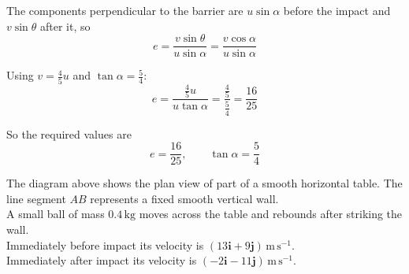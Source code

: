 \documentclass[leqno]{article}
\begin{document}
\begin{enumerate}[
  label=\textbf{\arabic*.},
  leftmargin=*,
  topsep=0pt,
  partopsep=0pt,
  parsep=0pt
]
\begin{djsSolution}
The components perpendicular to the barrier are \(u\sin\alpha\) before the impact and \(v\sin\theta\) after it, so
\[
e=\frac{v\sin\theta}{u\sin\alpha}
=\frac{v\cos\alpha}{u\sin\alpha}
\]

Using \(v=\frac45u\) and \(\tan\alpha=\frac54\):
\[
e=\frac{\frac45u}{u\tan\alpha}
=\frac{\frac45}{\frac54}
=\frac{16}{25}
\]

So the required values are
\[
e=\frac{16}{25},\qquad \tan\alpha=\frac54
\]
\end{djsSolution}


\newpage

\questionitem

\begin{figure}[H]
    \centering
{}
\end{figure}


The diagram above shows the plan view of part of a smooth horizontal table. The line segment $AB$ represents a fixed smooth vertical wall. \\

A small ball of mass $0.4\,\mathrm{kg}$ moves across the table and rebounds after striking the wall. \\

Immediately before impact its velocity is $(13\mathbf{i}+9\mathbf{j})\,\mathrm{m\,s^{-1}}$. \\

Immediately after impact its velocity is $(-2\mathbf{i}-11\mathbf{j})\,\mathrm{m\,s^{-1}}$. \\


\end{enumerate}
\end{document}
